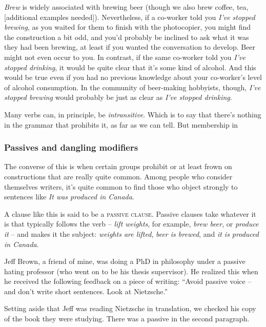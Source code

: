             \textit{Brew} is widely associated with brewing beer (though we also brew coffee, tea, [additional examples needed]). Nevertheless, if a co-worker told you \textit{I've stopped brewing}, as you waited for them to finish with the photocopier, you might find the construction a bit odd, and you'd probably be inclined to ask what it was they had been brewing, at least if you wanted the conversation to develop. Beer might not even occur to you. In contrast, if the same co-worker told you \textit{I've stopped drinking}, it would be quite clear that it's some kind of alcohol. And this would be true even if you had no previous knowledge about your co-worker's level of alcohol consumption. In the community of beer-making hobbyists, though, \textit{I've stopped brewing} would probably be just as clear as \textit{I've stopped drinking}.
    
            Many verbs can, in principle, be \textit{intransitive}. Which is to say that there's nothing in the grammar that prohibits it, as far as we can tell. But membership in 

        \subsubsection*{Passives and dangling modifiers}
    
            The converse of this is when certain groups prohibit or at least frown on constructions that are really quite common. Among people who consider themselves writers, it's quite common to find those who object strongly to sentences like \textit{It was produced in Canada}.
            
            A clause like this is said to be a \textsc{passive clause}. Passive clauses take whatever it is that typically follows the verb -- \textit{lift weights}, for example, \textit{brew beer}, or \textit{produce it} -- and makes it the subject: \textit{weights are lifted}, \textit{beer is brewed}, and \textit{it is produced in Canada}. 
            
            Jeff Brown, a friend of mine, was doing a PhD in philosophy under a passive hating professor (who went on to be his thesis supervisor). He realized this when he received the following feedback on a piece of writing: ``Avoid passive voice -- and don't write short sentences. Look at Nietzsche.''

            Setting aside that Jeff was reading Nietzsche in translation, we checked his copy of the book they were studying. There was a passive in the second paragraph.

